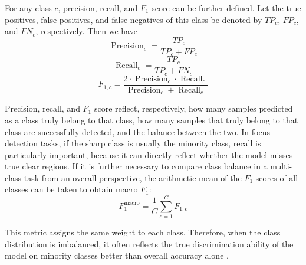 \par For any class $c$, precision, recall, and $F_1$ score can be further
defined. Let the true positives, false positives, and false negatives of this
class be denoted by $TP_c$, $FP_c$, and $FN_c$, respectively. Then we have
\begin{equation}
    \operatorname{Precision}_c=\frac{TP_c}{TP_c+FP_c}
    \label{eq:precision-basic}
\end{equation}
\begin{equation}
    \operatorname{Recall}_c=\frac{TP_c}{TP_c+FN_c}
    \label{eq:recall-basic}
\end{equation}
\begin{equation}
    F_{1,c}=
    \frac{2\cdot \operatorname{Precision}_c\cdot \operatorname{Recall}_c}
    {\operatorname{Precision}_c+\operatorname{Recall}_c}
    \label{eq:f1-basic}
\end{equation}
\par Precision, recall, and $F_1$ score reflect, respectively, how many samples
predicted as a class truly belong to that class, how many samples that truly
belong to that class are successfully detected, and the balance between the two.
In focus detection tasks, if the sharp class is usually the minority class,
recall is particularly important, because it can directly reflect whether the
model misses true clear regions. If it is further necessary to compare class
balance in a multi-class task from an overall perspective, the arithmetic mean
of the $F_1$ scores of all classes can be taken to obtain macro $F_1$:
\begin{equation}
    F_1^{\mathrm{macro}}=\frac{1}{C}\sum_{c=1}^{C}F_{1,c}
    \label{eq:macro-f1-basic}
\end{equation}
\par This metric assigns the same weight to each class. Therefore, when the
class distribution is imbalanced, it often reflects the true discrimination
ability of the model on minority classes better than overall accuracy alone
\cite[pp.~151--160,~256--280]{schutze2008introduction}.

